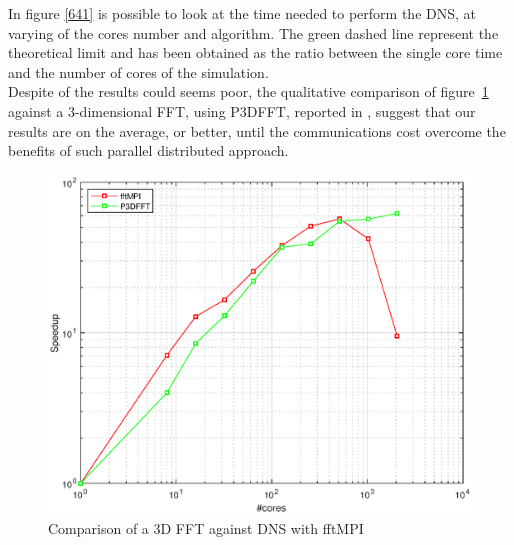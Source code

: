 In figure \ref{641} is possible to look at the time needed to perform the DNS, at varying of the cores number and algorithm.
The green dashed line represent the theoretical limit and has been obtained as the ratio between the single core time and the number of cores of the simulation.  \\
Despite of the results could seems poor, the qualitative comparison of figure~\ref{643} against a 3-dimensional FFT, using P3DFFT, reported in \cite[43]{tesi:brach}, suggest that our results are on the average, or better, until the communications cost overcome the benefits of such parallel distributed approach.

\begin{figure}
\begin{center}
\includegraphics[scale=0.6]{grafici/643}
\caption{Comparison of a 3D FFT against DNS with fftMPI}
\label{643}
\end{center}
\end{figure}

